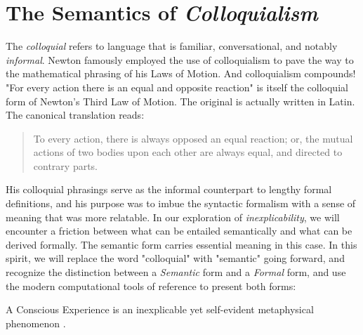 \documentclass[runningheads]{llncs}
\begin{document}
\section{The Semantics of \emph{Colloquialism}}

The \textit{colloquial} refers to language that is familiar, conversational, and notably \emph{informal}. Newton famously employed the use of colloquialism to pave the way to the mathematical phrasing of his Laws of Motion. And colloquialism compounds! "For every action there is an equal and opposite reaction" is itself the colloquial form of Newton's Third Law of Motion. The original is actually written in Latin. The canonical translation reads: 

\begin{quote}
To every action, there is always opposed an equal reaction; or, the mutual actions of two bodies upon each other are always equal, and directed to contrary parts. \cite{NewtonPrincipia}
\end{quote}

His colloquial phrasings serve as the informal counterpart to lengthy formal definitions, and his purpose was to imbue the syntactic formalism with a sense of meaning that was more relatable. In our exploration of \textit{inexplicability}, we will encounter a friction between what can be entailed semantically and what can be derived formally. The semantic form carries essential meaning in this case. In this spirit, we will replace the word "colloquial" with "semantic" going forward, and recognize the distinction between a \textit{Semantic} form and a \textit{Formal} form, and use the modern computational tools of reference to present both forms:

\setcounter{definition}{0}
\begin{sdefinition}
	A Conscious Experience is an inexplicable yet self-evident metaphysical phenomenon \cite{Formalism}.
\end{sdefinition}


\end{document}
